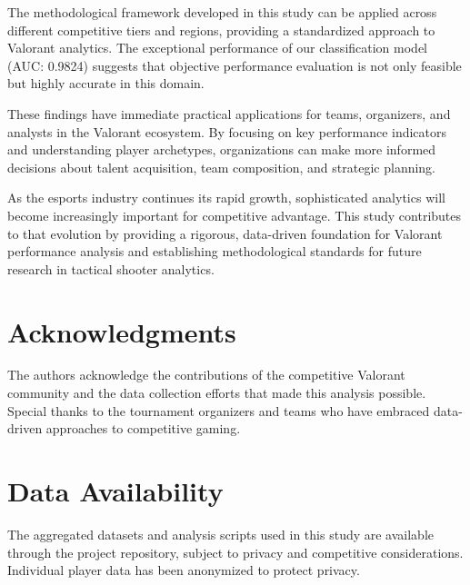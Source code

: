 \documentclass[11pt,a4paper]{article}
\begin{document}
The methodological framework developed in this study can be applied across different competitive tiers and regions, providing a standardized approach to Valorant analytics. The exceptional performance of our classification model (AUC: 0.9824) suggests that objective performance evaluation is not only feasible but highly accurate in this domain.

These findings have immediate practical applications for teams, organizers, and analysts in the Valorant ecosystem. By focusing on key performance indicators and understanding player archetypes, organizations can make more informed decisions about talent acquisition, team composition, and strategic planning.

As the esports industry continues its rapid growth, sophisticated analytics will become increasingly important for competitive advantage. This study contributes to that evolution by providing a rigorous, data-driven foundation for Valorant performance analysis and establishing methodological standards for future research in tactical shooter analytics.

\section*{Acknowledgments}

The authors acknowledge the contributions of the competitive Valorant community and the data collection efforts that made this analysis possible. Special thanks to the tournament organizers and teams who have embraced data-driven approaches to competitive gaming.

\section*{Data Availability}

The aggregated datasets and analysis scripts used in this study are available through the project repository, subject to privacy and competitive considerations. Individual player data has been anonymized to protect privacy.
\end{document}
